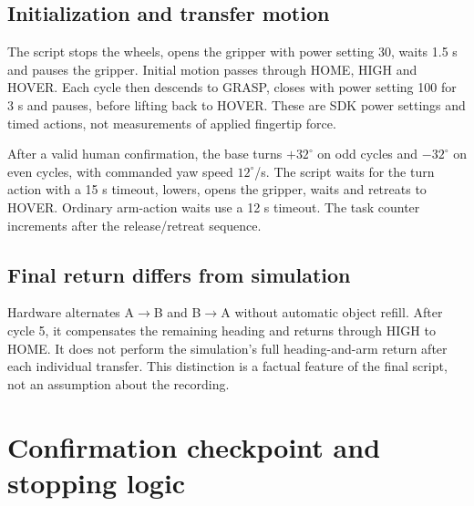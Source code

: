 \subsection{Initialization and transfer motion}
The script stops the wheels, opens the gripper with power setting 30, waits 1.5 s and pauses the gripper. Initial motion passes through HOME, HIGH and HOVER. Each cycle then descends to GRASP, closes with power setting 100 for 3 s and pauses, before lifting back to HOVER. These are SDK power settings and timed actions, not measurements of applied fingertip force.

After a valid human confirmation, the base turns $+32^\circ$ on odd cycles and $-32^\circ$ on even cycles, with commanded yaw speed $12^\circ$/s. The script waits for the turn action with a 15 s timeout, lowers, opens the gripper, waits and retreats to HOVER. Ordinary arm-action waits use a 12 s timeout. The task counter increments after the release/retreat sequence.
\subsection{Final return differs from simulation}
Hardware alternates A$\rightarrow$B and B$\rightarrow$A without automatic object refill. After cycle 5, it compensates the remaining heading and returns through HIGH to HOME. It does not perform the simulation's full heading-and-arm return after each individual transfer. This distinction is a factual feature of the final script, not an assumption about the recording.
\clearpage
\section{Confirmation checkpoint and stopping logic}
